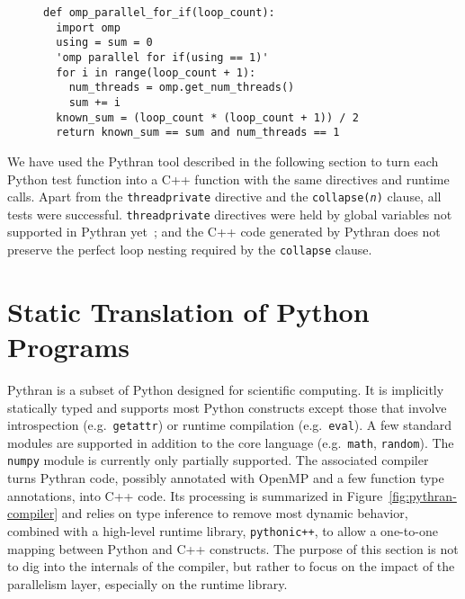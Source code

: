 \documentclass{llncs}
\begin{document}
\begin{figure}
    \begin{lstlisting}[label={lst:openmp-validation},caption={Example of Python
    OpenMP validation test case.}]
def omp_parallel_for_if(loop_count):
  import omp
  using = sum = 0
  'omp parallel for if(using == 1)'
  for i in range(loop_count + 1):
    num_threads = omp.get_num_threads()
    sum += i
  known_sum = (loop_count * (loop_count + 1)) / 2
  return known_sum == sum and num_threads == 1
    \end{lstlisting}
\end{figure}

We have used the Pythran tool described in the following section to turn each
Python test function into a C++ function with the same directives and runtime
calls. Apart from the \texttt{threadprivate} directive and the
\texttt{collapse(\emph{n})} clause, all tests were successful.
\texttt{threadprivate} directives were held by global variables not supported in
Pythran yet~; and the C++ code generated by Pythran does not preserve the perfect
loop nesting required by the \texttt{collapse} clause.

\section{Static Translation of Python Programs}\label{sec:python-static}

Pythran is a subset of Python designed for scientific computing. It is
implicitly statically typed and supports most Python constructs except those
that involve introspection (e.g.\ \texttt{getattr}) or runtime compilation
(e.g.\ \texttt{eval}). A few standard modules are supported in addition to the
core language (e.g.\ \texttt{math}, \texttt{random}). The \texttt{numpy} module
is currently only partially supported. The associated compiler turns Pythran
code, possibly annotated with OpenMP and a few function type annotations, into
C++ code. Its processing is summarized in Figure~\ref{fig:pythran-compiler} and
relies on type inference to remove most dynamic behavior, combined with a
high-level runtime library, \texttt{pythonic++}, to allow a one-to-one mapping
between Python and C++ constructs. The purpose of this section is not to dig
into the internals of the compiler, but rather to focus on the impact of the
parallelism layer, especially on the runtime library.
\end{document}

